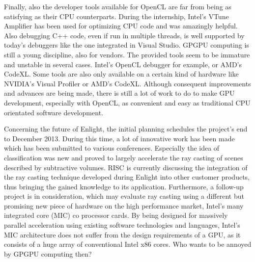Finally, also the developer tools available for OpenCL are far from being as satisfying as their CPU counterparts. During the internship, Intel's VTune Amplifier has been used for optimizing CPU code and was amazingly helpful. Also debugging C++ code, even if run in multiple threads, is well supported by today's debuggers like the one integrated in Visual Studio. GPGPU computing is still a young discipline, also for vendors. The provided tools seem to be immature and unstable in several cases. Intel's OpenCL debugger for example, or AMD's CodeXL. Some tools are also only available on a certain kind of hardware like NVIDIA's Visual Profiler or AMD's CodeXL. Although consequent improvements and advances are being made, there is still a lot of work to do to make GPU development, especially with OpenCL, as convenient and easy as traditional CPU orientated software development.

Concerning the future of Enlight, the initial planning schedules the project's end to December 2013. During this time, a lot of innovative work has been made which has been submitted to various conferences. Especially the idea of classification was new and proved to largely accelerate the ray casting of scenes described by subtractive volumes. RISC is currently discussing the integration of the ray casting technique developed during Enlight into other customer products, thus bringing the gained knowledge to its application. Furthermore, a follow-up project is in consideration, which may evaluate ray casting using a different but promising new piece of hardware on the high performance market, Intel's many integrated core (MIC) co processor cards. By being designed for massively parallel acceleration using existing software technologies and languages, Intel's MIC architecture does not suffer from the design requirements of a GPU, as it consists of a huge array of conventional Intel x86 cores. Who wants to be annoyed by GPGPU computing then?
